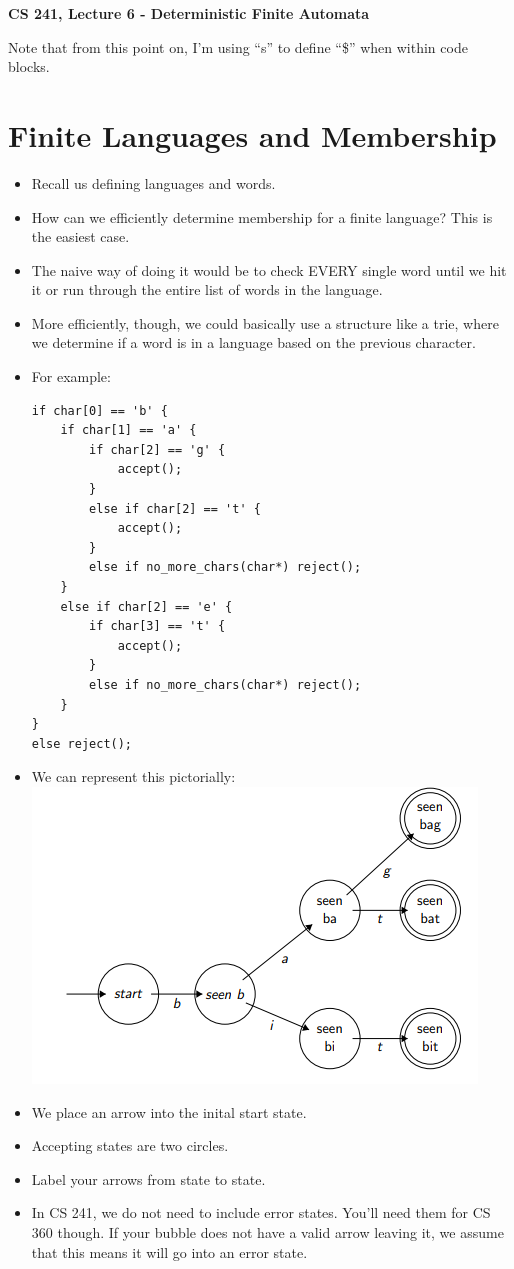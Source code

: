 \documentclass[12pt]{article}
\author{Clement Tsang}
\begin{document}
\begin{center}
\Large\textbf{CS 241, Lecture 6 - Deterministic Finite Automata}
\end{center}

Note that from this point on, I'm using ``s'' to define ``\$'' when within code blocks.  

\section{Finite Languages and Membership}
\begin{itemize}
    \item Recall us defining languages and words.
    \item How can we efficiently determine membership for a finite language?  This is the easiest case.
    \item The naive way of doing it would be to check EVERY single word until we hit it or run through the entire list of words in the language.
    \item More efficiently, though, we could basically use a structure like a trie, where we determine if a word is in a language based on the previous character.
    \item For example:
\begin{lstlisting}[mathescape, numbers=none, breaklines=true]
if char[0] == 'b' {
    if char[1] == 'a' {
        if char[2] == 'g' {
            accept();
        }
        else if char[2] == 't' {
            accept();
        }
        else if no_more_chars(char*) reject();
    }
    else if char[2] == 'e' {
        if char[3] == 't' {
            accept();
        }
        else if no_more_chars(char*) reject();
    }
}
else reject();
\end{lstlisting}
    \item We can represent this pictorially: \\
        \includegraphics{pictorial_example.png}
    \item We place an arrow into the inital start state.
    \item Accepting states are two circles.
    \item Label your arrows from state to state.
    \item In CS 241, we do not need to include error states.  You'll need them for CS 360 though.  If your bubble does not have a valid arrow leaving it, we assume that this means it will go into an error state.
\end{itemize}
\end{document}

